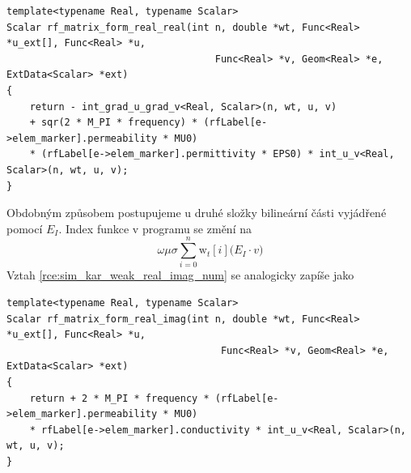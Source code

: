 \begin{verbatim}
template<typename Real, typename Scalar>
Scalar rf_matrix_form_real_real(int n, double *wt, Func<Real> *u_ext[], Func<Real> *u,
                                    Func<Real> *v, Geom<Real> *e, ExtData<Scalar> *ext)
{
    return - int_grad_u_grad_v<Real, Scalar>(n, wt, u, v)
    + sqr(2 * M_PI * frequency) * (rfLabel[e->elem_marker].permeability * MU0)
    * (rfLabel[e->elem_marker].permittivity * EPS0) * int_u_v<Real, Scalar>(n, wt, u, v);
}
\end{verbatim}
Obdobným způsobem postupujeme u druhé složky bilineární části vyjádřené pomocí $E_I$. Index funkce v programu se změní na 
\begin{equation}
 \omega\mu\sigma\sum_{i=0}^{n}\mathrm{w}_{t}[i]\bigg(E_I\cdot v\bigg)
	\label{rce:sim_kar_weak_real_imag_num} 
\end{equation}
Vztah \ref{rce:sim_kar_weak_real_imag_num} se analogicky zapíše jako
\begin{verbatim}
template<typename Real, typename Scalar>
Scalar rf_matrix_form_real_imag(int n, double *wt, Func<Real> *u_ext[], Func<Real> *u,
                                     Func<Real> *v, Geom<Real> *e, ExtData<Scalar> *ext)
{
    return + 2 * M_PI * frequency * (rfLabel[e->elem_marker].permeability * MU0) 
    * rfLabel[e->elem_marker].conductivity * int_u_v<Real, Scalar>(n, wt, u, v);
}
\end{verbatim}

